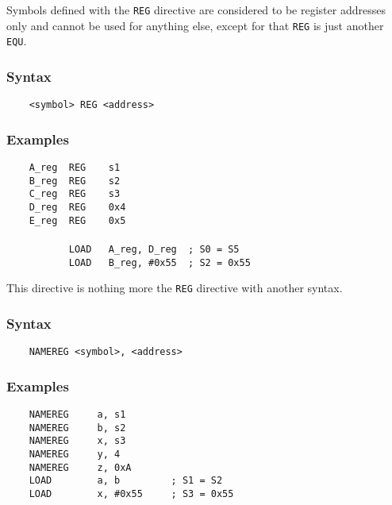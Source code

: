     \clearpage
        Symbols defined with the \texttt{REG} directive are considered to be register addresses only and cannot be used for anything else, except for that \texttt{REG} is just another \texttt{EQU}.

        \subsubsection{Syntax}
            \verb'    <symbol> REG <address>'

        \subsubsection{Examples}
            \verb'    A_reg  REG    s1'\\
            \verb'    B_reg  REG    s2'\\
            \verb'    C_reg  REG    s3'\\
            \verb'    D_reg  REG    0x4'\\
            \verb'    E_reg  REG    0x5'\\
            \verb''\\
            \verb'           LOAD   A_reg, D_reg  ; S0 = S5'\\
            \verb'           LOAD   B_reg, #0x55  ; S2 = 0x55'

        This directive is nothing more the \texttt{REG} directive with another syntax.

        \subsubsection{Syntax}
            \verb'    NAMEREG <symbol>, <address> '

        \subsubsection{Examples}
            \verb'    NAMEREG     a, s1'\\
            \verb'    NAMEREG     b, s2'\\
            \verb'    NAMEREG     x, s3'\\
            \verb'    NAMEREG     y, 4'\\
            \verb'    NAMEREG     z, 0xA'
            \verb''\\
            \verb'    LOAD        a, b         ; S1 = S2'\\
            \verb'    LOAD        x, #0x55     ; S3 = 0x55'

